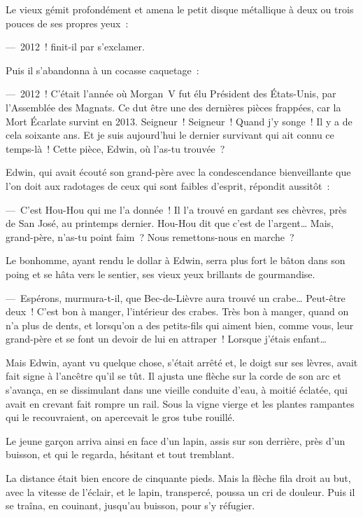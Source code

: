 \documentclass[french,twoside]{book} %
\begin{document}
Le vieux gémit profondément et amena le petit disque métallique à deux ou trois pouces de ses propres yeux :\par
— 2012 ! finit-il par s’exclamer.\par
Puis il s’abandonna à un cocasse caquetage :\par
— 2012 ! C’était l’année où Morgan V fut élu Président des États-Unis, par l’Assemblée des Magnats. Ce dut être une des dernières pièces frappées, car la Mort Écarlate survint en 2013. Seigneur ! Seigneur ! Quand j’y songe ! Il y a de cela soixante ans. Et je suis aujourd’hui le dernier survivant qui ait connu ce temps-là ! Cette pièce, Edwin, où l’as-tu trouvée ?\par
Edwin, qui avait écouté son grand-père avec la condescendance bienveillante que l’on doit aux radotages de ceux qui sont faibles d’esprit, répondit aussitôt :\par
— C’est Hou-Hou qui me l’a donnée ! Il l’a trouvé en gardant ses chèvres, près de San José, au printemps dernier. Hou-Hou dit que c’est de l’argent… Mais, grand-père, n’as-tu point faim ? Nous remettons-nous en marche ?\par
Le bonhomme, ayant rendu le dollar à Edwin, serra plus fort le bâton dans son poing et se hâta vers le sentier, ses vieux yeux brillants de gourmandise.\par
— Espérons, murmura-t-il, que Bec-de-Lièvre aura trouvé un crabe… Peut-être deux ! C’est bon à manger, l’intérieur des crabes. Très bon à manger, quand on n’a plus de dents, et lorsqu’on a des petits-fils qui aiment bien, comme vous, leur grand-père et se font un devoir de lui en attraper ! Lorsque j’étais enfant…\par
Mais Edwin, ayant vu quelque chose, s’était arrêté et, le doigt sur ses lèvres, avait fait signe à l’ancêtre qu’il se tût. Il ajusta une flèche sur la corde de son arc et s’avança, en se dissimulant dans une vieille conduite d’eau, à moitié éclatée, qui avait en crevant fait rompre un rail. Sous la vigne vierge et les plantes rampantes qui le recouvraient, on apercevait le gros tube rouillé.\par
Le jeune garçon arriva ainsi en face d’un lapin, assis sur son derrière, près d’un buisson, et qui le regarda, hésitant et tout tremblant.\par
La distance était bien encore de cinquante pieds. Mais la flèche fila droit au but, avec la vitesse de l’éclair, et le lapin, transpercé, poussa un cri de douleur. Puis il se traîna, en couinant, jusqu’au buisson, pour s’y réfugier.\par
\end{document}

